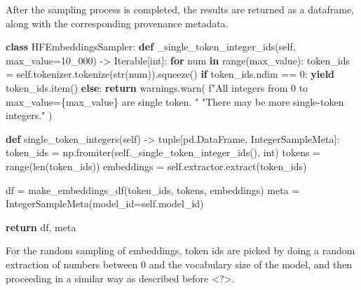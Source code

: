 \documentclass[
  a4paper, twoside, 10pt, titlepage]{book}
\newenvironment{Shaded}{}{}
\newcommand{\BuiltInTok}[1]{\textcolor[rgb]{0.00,0.50,0.00}{#1}}
\newcommand{\ControlFlowTok}[1]{\textcolor[rgb]{0.00,0.44,0.13}{\textbf{#1}}}
\newcommand{\DecValTok}[1]{\textcolor[rgb]{0.25,0.63,0.44}{#1}}
\newcommand{\KeywordTok}[1]{\textcolor[rgb]{0.00,0.44,0.13}{\textbf{#1}}}
\newcommand{\NormalTok}[1]{#1}
\newcommand{\OperatorTok}[1]{\textcolor[rgb]{0.40,0.40,0.40}{#1}}
\newcommand{\SpecialCharTok}[1]{\textcolor[rgb]{0.25,0.44,0.63}{#1}}
\newcommand{\SpecialStringTok}[1]{\textcolor[rgb]{0.73,0.40,0.53}{#1}}
\newcommand{\StringTok}[1]{\textcolor[rgb]{0.25,0.44,0.63}{#1}}
\newcommand{\VariableTok}[1]{\textcolor[rgb]{0.10,0.09,0.49}{#1}}
\begin{document}
After the sampling process is completed, the results are returned as a
dataframe, along with the corresponding provenance metadata.

\begin{Shaded}
\begin{Highlighting}[]

\KeywordTok{class}\NormalTok{ HFEmbeddingsSampler:}
    \KeywordTok{def}\NormalTok{ \_single\_token\_integer\_ids(}\VariableTok{self}\NormalTok{, max\_value}\OperatorTok{=}\DecValTok{10\_000}\NormalTok{) }\OperatorTok{{-}\textgreater{}}\NormalTok{ Iterable[}\BuiltInTok{int}\NormalTok{]:}
        \ControlFlowTok{for}\NormalTok{ num }\KeywordTok{in} \BuiltInTok{range}\NormalTok{(max\_value):}
\NormalTok{            token\_ids }\OperatorTok{=} \VariableTok{self}\NormalTok{.tokenizer.tokenize(}\BuiltInTok{str}\NormalTok{(num)).squeeze()}
            \ControlFlowTok{if}\NormalTok{ token\_ids.ndim }\OperatorTok{==} \DecValTok{0}\NormalTok{:}
                \ControlFlowTok{yield}\NormalTok{ token\_ids.item()}
            \ControlFlowTok{else}\NormalTok{:}
                \ControlFlowTok{return}
\NormalTok{        warnings.warn(}
            \SpecialStringTok{f"All integers from 0 to max\_value=}\SpecialCharTok{\{}\NormalTok{max\_value}\SpecialCharTok{\}}\SpecialStringTok{ are single token. "}
            \StringTok{"There may be more single{-}token integers."}
\NormalTok{        )}

    \KeywordTok{def}\NormalTok{ single\_token\_integers(}\VariableTok{self}\NormalTok{) }\OperatorTok{{-}\textgreater{}} \BuiltInTok{tuple}\NormalTok{[pd.DataFrame, IntegerSampleMeta]:}
\NormalTok{        token\_ids }\OperatorTok{=}\NormalTok{ np.fromiter(}\VariableTok{self}\NormalTok{.\_single\_token\_integer\_ids(), }\BuiltInTok{int}\NormalTok{)}
\NormalTok{        tokens }\OperatorTok{=} \BuiltInTok{range}\NormalTok{(}\BuiltInTok{len}\NormalTok{(token\_ids))}
\NormalTok{        embeddings }\OperatorTok{=} \VariableTok{self}\NormalTok{.extractor.extract(token\_ids)}

\NormalTok{        df }\OperatorTok{=}\NormalTok{ make\_embeddings\_df(token\_ids, tokens, embeddings)}
\NormalTok{        meta }\OperatorTok{=}\NormalTok{ IntegerSampleMeta(model\_id}\OperatorTok{=}\VariableTok{self}\NormalTok{.model\_id)}

        \ControlFlowTok{return}\NormalTok{ df, meta}
\end{Highlighting}
\end{Shaded}

For the random sampling of embeddings, token ids are picked by doing a
random extraction of numbers between 0 and the vocabulary size of the
model, and then proceeding in a similar way as described before
\textless?\textgreater.
\end{document}
